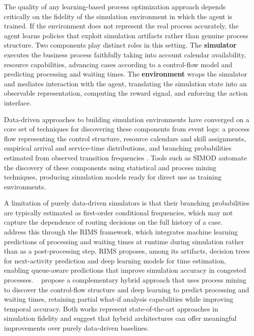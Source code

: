 \documentclass[journal,onecolumn]{IEEEtran}
\begin{document}
The quality of any learning-based process optimization approach
depends critically on the fidelity of the simulation environment
in which the agent is trained. If the environment does not represent
the real process accurately, the agent learns policies that exploit
simulation artifacts rather than genuine process structure. Two
components play distinct roles in this setting. The \textbf{simulator}
executes the business process faithfully taking into account calendar availability,
resource capabilities, advancing cases according
to a control-flow model and predicting processing and waiting times.
The \textbf{environment} wraps the simulator and mediates interaction
with the agent, translating the simulation state into an observable
representation, computing the reward signal, and enforcing the
action interface.

Data-driven approaches to building simulation environments have
converged on a core set of techniques for discovering these components
from event logs: a process flow representing the control structure,
resource calendars and skill assignments, empirical arrival and
service-time distributions, and branching probabilities estimated
from observed transition frequencies
\cite{law_kelton_2015, banks_2010, laguna_marklund_2019}. Tools
such as SIMOD \cite{SIMOD} automate the discovery of these components
using statistical and process mining techniques, producing simulation
models ready for direct use as training environments.

A limitation of purely data-driven simulators is that their branching
probabilities are typically estimated as first-order conditional
frequencies, which may not capture the dependence of routing decisions
on the full history of a case.
\citeauthor{Runtime_integration_of_simulation_for_business_processes}~\cite{Runtime_integration_of_simulation_for_business_processes}
address this through the RIMS framework, which integrates machine
learning predictions of processing and waiting times at runtime
during simulation rather than as a post-processing step. RIMS
proposes, among its artifacts, decision trees for next-activity
prediction and deep learning models for time estimation, enabling
queue-aware predictions that improve simulation accuracy in congested
processes.
\citeauthor{camargo2023hybrid}~\cite{camargo2023hybrid} propose a
complementary hybrid approach that uses process mining to discover
the control-flow structure and deep learning to predict processing
and waiting times, retaining partial what-if analysis capabilities
while improving temporal accuracy. Both works represent state-of-the-art
approaches in simulation fidelity and suggest that hybrid architectures
can offer meaningful improvements over purely data-driven baselines.
\end{document}
